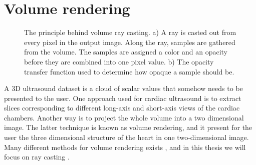 \section{Volume rendering}\label{sec:volren}
\begin{figure}[t!]
\centering
{}
\caption{The principle behind volume ray casting. a) A ray is casted out from every pixel in the output image. Along the ray, samples are gathered from the volume. The samples are assigned a color and an opacity before they are combined into one pixel value. b) The opacity transfer function used to determine how opaque a sample should be.}
\label{fig:vr}
\end{figure}
A 3D ultrasound dataset is a cloud of scalar values that somehow needs to be presented to the user. One approach used for cardiac ultrasound  is to extract slices corresponding to different long-axis and short-axis views of the cardiac chambers. Another way is to project the whole volume into a two dimensional image. The latter technique is known as volume rendering, and it present for the user the three dimensional structure of the heart in one two-dimensional image. Many different methods for volume rendering exists \cite{brodlie2001}, and in this thesis we will focus on ray casting \cite{Levoy1988}. 

